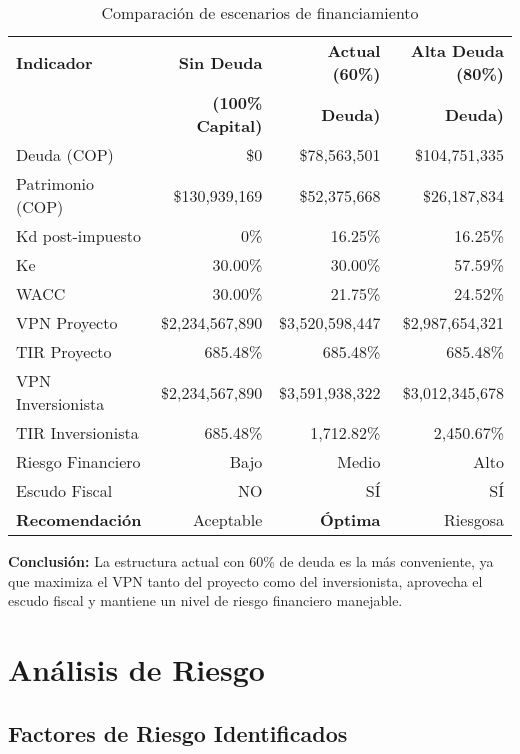 \begin{table}[H]
\centering
\small
\begin{tabular}{lrrr}
\toprule
\textbf{Indicador} & \textbf{Sin Deuda} & \textbf{Actual (60\%)} & \textbf{Alta Deuda (80\%)} \\
 & \textbf{(100\% Capital)} & \textbf{Deuda)} & \textbf{Deuda)} \\
\midrule
Deuda (COP) & \$0 & \$78,563,501 & \$104,751,335 \\
Patrimonio (COP) & \$130,939,169 & \$52,375,668 & \$26,187,834 \\
Kd post-impuesto & 0\% & 16.25\% & 16.25\% \\
Ke & 30.00\% & 30.00\% & 57.59\% \\
WACC & 30.00\% & 21.75\% & 24.52\% \\
\midrule
VPN Proyecto & \$2,234,567,890 & \$3,520,598,447 & \$2,987,654,321 \\
TIR Proyecto & 685.48\% & 685.48\% & 685.48\% \\
VPN Inversionista & \$2,234,567,890 & \$3,591,938,322 & \$3,012,345,678 \\
TIR Inversionista & 685.48\% & 1,712.82\% & 2,450.67\% \\
\midrule
Riesgo Financiero & Bajo & Medio & Alto \\
Escudo Fiscal & NO & SÍ & SÍ \\
\textbf{Recomendación} & Aceptable & \textbf{Óptima} & Riesgosa \\
\bottomrule
\end{tabular}
\caption{Comparación de escenarios de financiamiento}
\end{table}

\textbf{Conclusión:} La estructura actual con 60\% de deuda es la más conveniente, ya que maximiza el VPN tanto del proyecto como del inversionista, aprovecha el escudo fiscal y mantiene un nivel de riesgo financiero manejable.

\section{Análisis de Riesgo}

\subsection{Factores de Riesgo Identificados}

